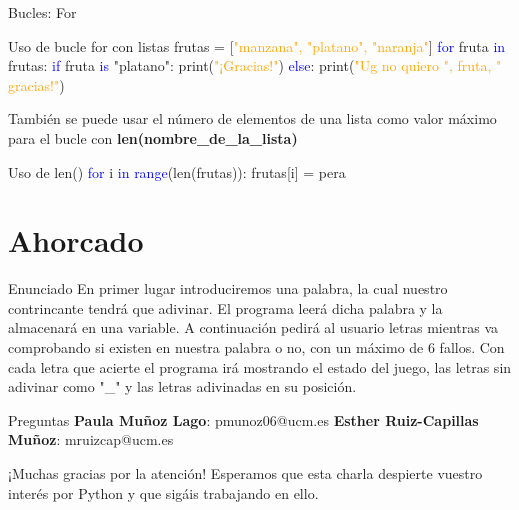 \documentclass{beamer}
\begin{document}
\begin{frame}{Bucles: For}
\begin{Programexample}{Uso de bucle for con listas}
frutas = [\textcolor{orange}{"manzana", "platano", "naranja"}] \newline
\textcolor{blue}{for} fruta \textcolor{blue}{in} frutas: \newline
\hspace*{1cm}\textcolor{blue}{if} fruta \textcolor{blue}{is} "platano": \newline
\hspace*{2cm} print(\textcolor{orange}{"¡Gracias!"}) \newline
\hspace*{1cm}\textcolor{blue}{else}: \newline
\hspace*{2cm} print(\textcolor{orange}{"Ug no quiero ", fruta, " gracias!"})
\end{Programexample}
También se puede usar el número de elementos de una lista como valor máximo para el bucle con \textbf{len(nombre\_de\_la\_lista)}
\begin{Programexample}{Uso de len()}
\textcolor{blue}{for} i \textcolor{blue}{in range}(len(frutas)): \newline
\hspace*{1cm} frutas[i] = pera
\end{Programexample}
\end{frame}

\section{Ahorcado}

\begin{frame}{Enunciado}
En primer lugar introduciremos una palabra, la cual nuestro contrincante tendrá que adivinar. El programa leerá dicha palabra y la almacenará en una variable.
A continuación pedirá al usuario letras mientras va comprobando si existen en nuestra palabra o no, con un máximo de 6 fallos.
Con cada letra que acierte el programa irá mostrando el estado del juego, las letras sin adivinar como "\_" y las letras adivinadas en su posición.
\end{frame}

\begin{frame}{Preguntas}
\textbf{Paula Muñoz Lago}: pmunoz06@ucm.es \newline
\textbf{Esther Ruiz-Capillas Muñoz}: mruizcap@ucm.es
\end{frame}

\begin{frame}[focus]
¡Muchas gracias por la atención! \newline
Esperamos que esta charla despierte vuestro interés por Python y que sigáis trabajando en ello.
\end{frame}
\end{document}
